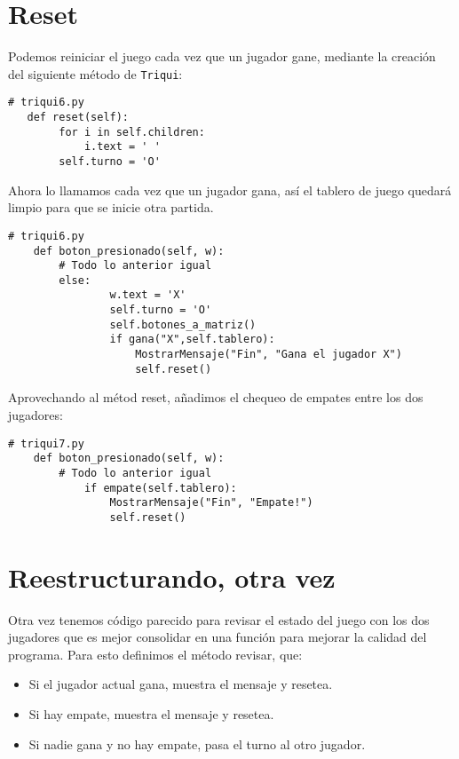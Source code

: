 \section{Reset}

Podemos reiniciar el juego cada vez que un jugador gane, mediante la 
creación del siguiente método de \texttt{Triqui}:

\beforeverb
\begin{verbatim}
# triqui6.py
   def reset(self):
        for i in self.children:
            i.text = ' '
        self.turno = 'O'
\end{verbatim}
\afterverb

Ahora lo llamamos cada vez que un jugador gana, así el tablero de
juego quedará limpio para que se inicie otra partida.

\beforeverb
\begin{verbatim}
# triqui6.py
    def boton_presionado(self, w):
        # Todo lo anterior igual
        else:
                w.text = 'X'
                self.turno = 'O'
                self.botones_a_matriz()
                if gana("X",self.tablero):
                    MostrarMensaje("Fin", "Gana el jugador X")
                    self.reset()
\end{verbatim}
\afterverb

Aprovechando al métod reset, añadimos el chequeo de empates entre 
los dos jugadores:

\beforeverb
\begin{verbatim}
# triqui7.py
    def boton_presionado(self, w):
        # Todo lo anterior igual
            if empate(self.tablero):
                MostrarMensaje("Fin", "Empate!")
                self.reset()
\end{verbatim}
\afterverb

\section{Reestructurando, otra vez}

Otra vez tenemos código parecido para revisar el estado del juego
con los dos jugadores que es mejor consolidar en una función para 
mejorar la calidad del programa. Para esto definimos el método 
revisar, que:

\begin{itemize}
 \item Si el jugador actual gana, muestra el mensaje y resetea.
 
 \item Si hay empate, muestra el mensaje y resetea.
 
 \item Si nadie gana y no hay empate, pasa el turno al otro jugador.
\end{itemize}

